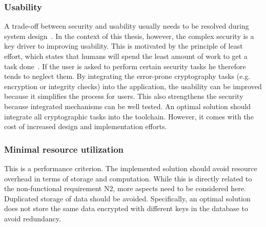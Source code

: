 \documentclass[../main.tex]{subfiles}
\begin{document}
\subsubsection{Usability}
A trade-off between security and usability usually needs to be resolved during system design~\cite{Braz2007}.
In the context of this thesis, however, the complex security is a key driver to improving usability.
This is motivated by the principle of least effort, which states that humans will spend the least amount of work to get a task done~\cite{Levenson2018}.
If the user is asked to perform certain security tasks he therefore tends to neglect them.
By integrating the error-prone cryptography tasks (e.g. encryption or integrity checks) into the application, the usability can be improved because it simplifies the process for users.
This also strengthens the security because integrated mechanisms can be well tested.
An optimal solution should integrate all cryptographic tasks into the toolchain.
However, it comes with the cost of increased design and implementation efforts.

\subsubsection{Minimal resource utilization}
This is a performance criterion.
The implemented solution should avoid resource overhead in terms of storage and computation.
While this is directly related to the non-functional requirement N2, more aspects need to be considered here.
Duplicated storage of data should be avoided.
Specifically, an optimal solution does not store the same data encrypted with different keys in the database to avoid redundancy.
\end{document}
